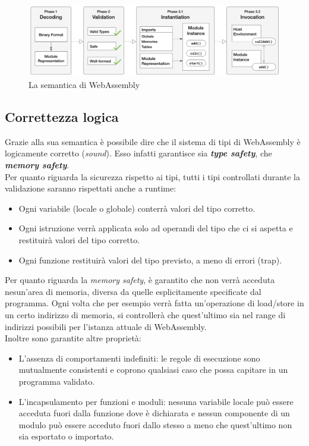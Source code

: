 \begin{figure}
        \begin{center}
                \includegraphics[width=0.97\columnwidth]{images/wasmSemanticPhases.png}
        \end{center}
        \caption{La semantica di WebAssembly}
        \label{fig:wasmPhases}
\end{figure}

\newpage
\subsection{Correttezza logica}
\label{subsec:soundness}
Grazie alla sua semantica è possibile dire che il sistema di tipi di WebAssembly è logicamente corretto (\emph{sound})\cite*{wasm:soundness}. Esso infatti garantisce sia \emph{\textbf{type safety}}, che \emph{\textbf{memory safety}}.
\\Per quanto riguarda la sicurezza rispetto ai tipi, tutti i tipi controllati durante la validazione saranno rispettati anche a runtime:
\begin{itemize}
        \item Ogni variabile (locale o globale) conterrà valori del tipo corretto.
        \item Ogni istruzione verrà applicata solo ad operandi del tipo che ci si aspetta e restituirà valori del tipo corretto.
        \item Ogni funzione restituirà valori del tipo previsto, a meno di errori (trap).
\end{itemize}
Per quanto riguarda la \emph{memory safety}, è garantito che non verrà acceduta nesun'area di memoria, diversa da quelle esplicitamente specificate dal programma. Ogni volta che per esempio verrà fatta un'operazione di load/store in un certo indirizzo di memoria, si controllerà che quest'ultimo sia nel range di indirizzi possibili per l'istanza attuale di WebAssembly.
\\Inoltre sono garantite altre proprietà: 
\begin{itemize}
        \item L'assenza di comportamenti indefiniti: le regole di esecuzione sono mutualmente consistenti e coprono qualsiasi caso che possa capitare in un programma validato.
        \item L'incapsulamento per funzioni e moduli: nessuna variabile locale può essere acceduta fuori dalla funzione dove è dichiarata e nessun componente di un modulo può essere acceduto fuori dallo stesso a meno che quest'ultimo non sia esportato o importato.
\end{itemize}
